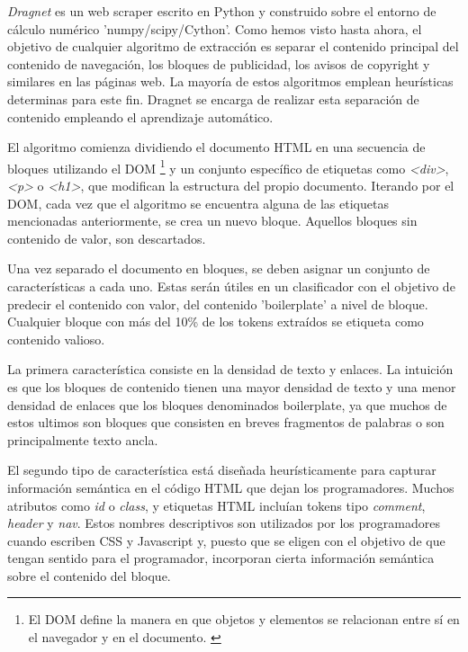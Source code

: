 \emph{Dragnet} \cite{dragnet} es un web scraper escrito en Python y construido sobre el entorno de cálculo
numérico 'numpy/scipy/Cython'. Como hemos visto hasta ahora, el objetivo de cualquier algoritmo de
extracción es separar el contenido principal del contenido de navegación, los bloques de publicidad, los
avisos de copyright y similares en las páginas web. La mayoría de estos algoritmos emplean heurísticas
determinas para este fin. Dragnet se encarga de realizar esta separación de contenido empleando el
aprendizaje automático.

El algoritmo comienza dividiendo el documento HTML en una secuencia de bloques utilizando el DOM 
\footnote{El DOM define la manera en que objetos y elementos se relacionan entre sí en el navegador y en 
el documento. \cite{dom-wikipedia}} y un conjunto específico de etiquetas como \emph{<div>}, \emph{<p>} o
\emph{<h1>}, que modifican la estructura del propio documento. Iterando por el DOM, cada vez que el algoritmo 
se encuentra alguna de las etiquetas mencionadas anteriormente, se crea un nuevo bloque. Aquellos bloques
sin contenido de valor, son descartados. 

Una vez separado el documento en bloques, se deben asignar un conjunto de características a cada uno. Estas 
serán útiles en un clasificador con el objetivo de predecir el contenido con valor, del contenido 
'boilerplate' a nivel de bloque. Cualquier bloque con más del 10\% de los tokens extraídos se etiqueta 
como contenido valioso.

La primera característica consiste en la densidad de texto y enlaces. La intuición es que los bloques de 
contenido tienen una mayor densidad de texto y una menor densidad de enlaces que los bloques denominados 
boilerplate, ya que muchos de estos ultimos son bloques que consisten en breves fragmentos de palabras o 
son principalmente texto ancla. 

El segundo tipo de característica está diseñada heurísticamente para capturar información semántica en el
código HTML que dejan los programadores. Muchos atributos como \emph{id} o \emph{class}, y etiquetas HTML 
incluían tokens tipo \emph{comment}, \emph{header} y \emph{nav}. Estos nombres descriptivos son utilizados 
por los programadores cuando escriben CSS y Javascript y, puesto que se eligen con el objetivo de que tengan 
sentido para el programador, incorporan cierta información semántica sobre el contenido del bloque.

